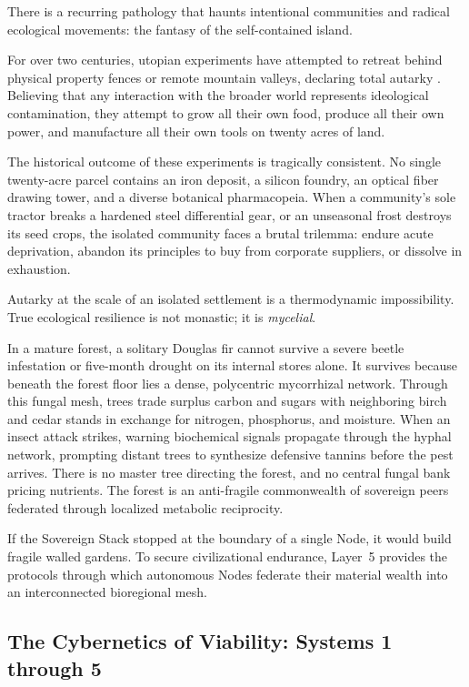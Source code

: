 There is a recurring pathology that haunts intentional communities and radical ecological movements: the fantasy of the self-contained island.

For over two centuries, utopian experiments have attempted to retreat behind physical property fences or remote mountain valleys, declaring total autarky \parencite{kanter1972, christian2003}. Believing that any interaction with the broader world represents ideological contamination, they attempt to grow all their own food, produce all their own power, and manufacture all their own tools on twenty acres of land. 

The historical outcome of these experiments is tragically consistent. No single twenty-acre parcel contains an iron deposit, a silicon foundry, an optical fiber drawing tower, and a diverse botanical pharmacopeia. When a community's sole tractor breaks a hardened steel differential gear, or an unseasonal frost destroys its seed crops, the isolated community faces a brutal trilemma: endure acute deprivation, abandon its principles to buy from corporate suppliers, or dissolve in exhaustion.

Autarky at the scale of an isolated settlement is a thermodynamic impossibility. True ecological resilience is not monastic; it is \textit{mycelial}.

In a mature forest, a solitary Douglas fir cannot survive a severe beetle infestation or five-month drought on its internal stores alone. It survives because beneath the forest floor lies a dense, polycentric mycorrhizal network. Through this fungal mesh, trees trade surplus carbon and sugars with neighboring birch and cedar stands in exchange for nitrogen, phosphorus, and moisture. When an insect attack strikes, warning biochemical signals propagate through the hyphal network, prompting distant trees to synthesize defensive tannins before the pest arrives. There is no master tree directing the forest, and no central fungal bank pricing nutrients. The forest is an anti-fragile commonwealth of sovereign peers federated through localized metabolic reciprocity.

If the Sovereign Stack stopped at the boundary of a single Node, it would build fragile walled gardens. To secure civilizational endurance, Layer~5 provides the protocols through which autonomous Nodes federate their material wealth into an interconnected bioregional mesh.

\subsection{The Cybernetics of Viability: Systems 1 through 5}

